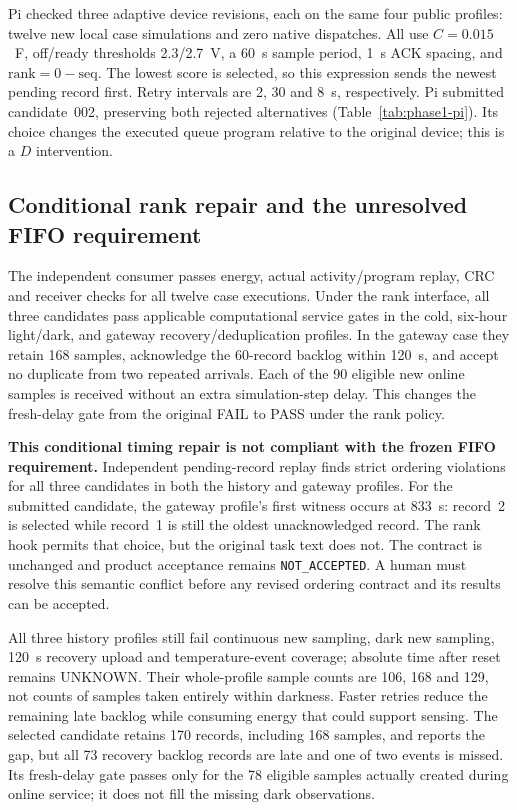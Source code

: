 Pi checked three adaptive device revisions, each on the same four public
profiles: twelve new local case simulations and zero native dispatches. All use
$C=0.015$~F, off/ready thresholds 2.3/2.7~V, a 60~s sample period, 1~s ACK
spacing, and $\mathrm{rank}=0-\mathrm{seq}$. The lowest score is selected, so
this expression sends the newest pending record first. Retry intervals are
2, 30 and 8~s, respectively. Pi submitted candidate~002, preserving both rejected
alternatives (Table~\ref{tab:phase1-pi}). Its choice changes the executed queue
program relative to the original device; this is a $D$ intervention.



\subsection{Conditional rank repair and the unresolved FIFO requirement}
The independent consumer passes energy, actual activity/program replay, CRC and
receiver checks for all twelve case executions. Under the rank interface, all
three candidates pass applicable computational service gates in the cold,
six-hour light/dark, and gateway recovery/deduplication profiles. In the gateway
case they retain 168 samples, acknowledge the 60-record backlog within 120~s,
and accept no duplicate from two repeated arrivals. Each of the 90 eligible new
online samples is received without an extra simulation-step delay. This changes
the fresh-delay gate from the original FAIL to PASS under the rank policy.

\textbf{This conditional timing repair is not compliant with the frozen FIFO
requirement.} Independent pending-record replay finds strict ordering violations
for all three candidates in both the history and gateway profiles. For the
submitted candidate, the gateway profile's first witness occurs at 833~s:
record~2 is selected while record~1 is still the oldest unacknowledged record.
The rank hook permits that choice, but the original task text does not.
The contract is unchanged and product acceptance remains \texttt{NOT\_ACCEPTED}.
A human must resolve this semantic conflict before any revised ordering contract
and its results can be accepted.

All three history profiles still fail continuous new sampling, dark new sampling,
120~s recovery upload and temperature-event coverage; absolute time after reset
remains UNKNOWN. Their whole-profile sample counts are 106, 168 and 129, not
counts of samples taken entirely within darkness. Faster retries reduce the
remaining late backlog while consuming energy that could support sensing.
The selected candidate retains 170 records, including 168 samples, and reports
the gap, but all 73 recovery backlog records are late and one of two events is
missed. Its fresh-delay gate passes only for the 78 eligible samples actually
created during online service; it does not fill the missing dark observations.

